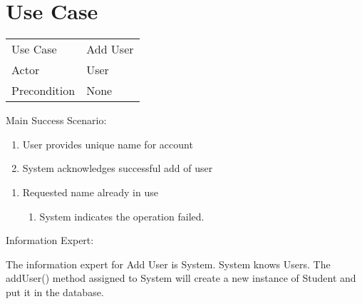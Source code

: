 \documentclass{article}
\begin{document}
\section*{Use Case}

\begin{tabular}{l l}
Use Case     & Add User \\
Actor        & User \\
Precondition & None \\
\end{tabular}

Main Success Scenario:

\begin{enumerate}
    \item User provides unique name for account
    \item System acknowledges successful add of user
\end{enumerate}

\begin{enumerate}
    \item Requested name already in use
    \begin{enumerate}
        \item System indicates the operation failed.
    \end{enumerate}
\end{enumerate}

Information Expert:

The information expert for Add User is System.
System knows Users.
The addUser() method assigned to System will create a new instance of Student and put it in the database.
\end{document}
